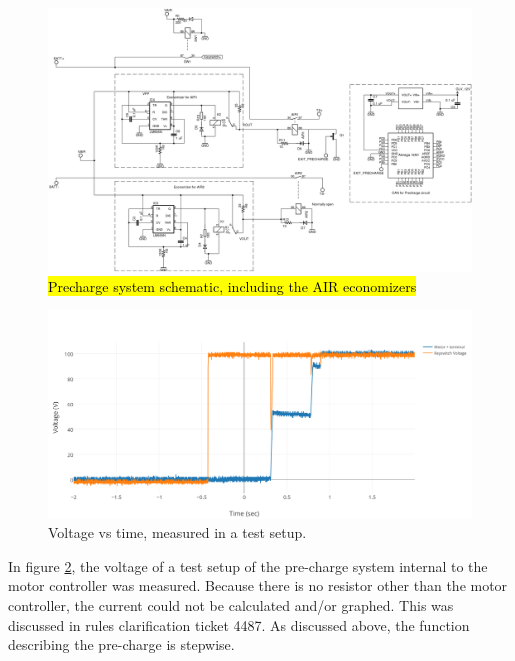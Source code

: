 \documentclass{article}
\DeclareRobustCommand{\hlr}[1]{{\sethlcolor{red}\hl{#1}}}
\begin{document}
        \begin{figure}
            \includegraphics[width=\textheight]{precharge}
            \caption{\hlr{Precharge system schematic, including the AIR economizers}}
            \label{prechargeschem}
        \end{figure}

            \begin{figure}[H]
                \centering
                \includegraphics[width = 0.8 \textwidth]{PrechargeVoltage}
                \caption{Voltage vs time, measured in a test setup. }
                \label{PCvoltage}
            \end{figure}

            In figure \ref{PCvoltage}, the voltage of a test setup of the pre-charge system internal to the motor controller was measured. Because there is no resistor other than the motor controller, the current could not be calculated and/or graphed. This was discussed in rules clarification ticket 4487. As discussed above, the function describing the pre-charge is stepwise.
\end{document}
